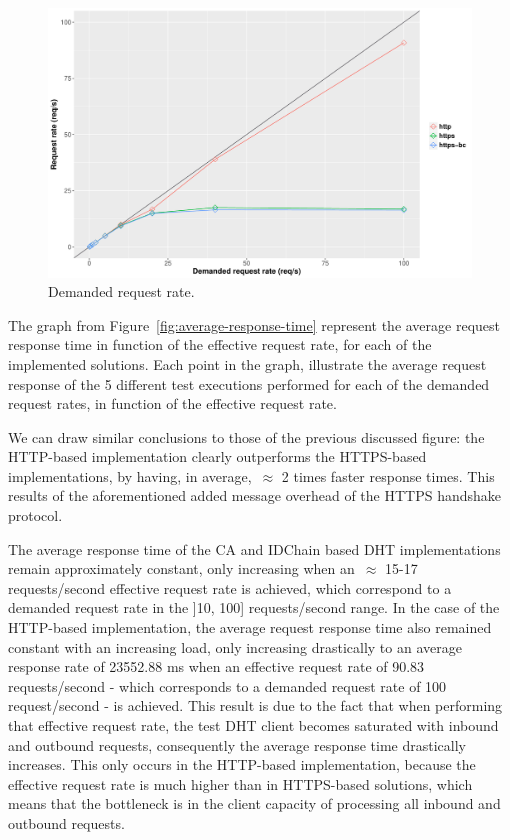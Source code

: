 \begin{figure}[h!]
  \centering
  \includegraphics[scale=0.4]{Figures/evaluation/request-rate-writes-linear.pdf}
  \caption{Demanded request rate.}
\label{fig:demanded-request-rate}
\end{figure}


The graph from Figure~\ref{fig:average-response-time} represent the average request response time in function of the effective request rate, for each of the implemented solutions.
Each point in the graph, illustrate the average request response of the 5 different test executions performed for each of the demanded request rates, in function of the effective request rate.

We can draw similar conclusions to those of the previous discussed figure: the HTTP-based implementation clearly outperforms the HTTPS-based implementations, by having, in average,~$\approx$ 2 times faster response times.
This results of the aforementioned added message overhead of the HTTPS handshake protocol.

The average response time of the CA and IDChain based DHT implementations remain approximately constant, only increasing when an~$\approx$ 15-17 requests/second effective request rate is achieved, which correspond to a demanded request rate in the ]10, 100] requests/second range.
In the case of the HTTP-based implementation, the average request response time also remained constant with an increasing load, only increasing drastically to an average response rate of 23552.88 ms when an effective request rate of 90.83 requests/second - which corresponds to a demanded request rate of 100 request/second - is achieved.
This result is due to the fact that when performing that effective request rate, the test DHT client becomes saturated with inbound and outbound requests, consequently the average response time drastically increases.
This only occurs in the HTTP-based implementation, because the effective request rate is much higher than in HTTPS-based solutions, which means that the bottleneck is in the client capacity of processing all inbound and outbound requests.

